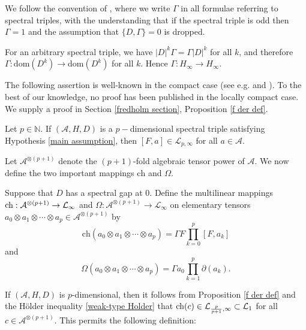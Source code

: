     We follow the convention of \cite{CGRS2}, where we write $\Gamma$ in all formulae referring to spectral triples, with the understanding that if the spectral triple is odd then $\Gamma=1$ and the assumption that $\{D,\Gamma\}=0$ is dropped.
    
    For an arbitrary spectral triple, we have $|D|^k\Gamma = \Gamma|D|^k$ for all $k$, and therefore $\Gamma:\mathrm{dom}(D^k)\to \mathrm{dom}(D^k)$ for all $k$. Hence $\Gamma:H_\infty\to H_\infty$.
    
    The following assertion is well-known in the compact case (see e.g. \cite{CPRS1} and \cite{PS-crelle}). To the best of our knowledge, no proof has been published in the locally compact case. 
    We supply a proof in Section \ref{fredholm section}, Proposition \ref{f der def}.
    \begin{prop*}
        {Let $p \in \mathbb{N}$.} If $(\mathcal{A},H,D)$ is a $p-$dimensional spectral triple satisfying Hypothesis \ref{main assumption}, then $[F,a]\in\mathcal{L}_{p,\infty}$ for all $a\in\mathcal{A}.$
    \end{prop*}
        
    Let $\mathcal{A}^{\otimes(p+1)}$ denote the $(p+1)$-fold algebraic tensor power of $\mathcal{A}$. We now define the two important mappings $\mathrm{ch}$ and $\Omega$.
    \begin{defi}\label{ch omega def} 
        Suppose that $D$ has a spectral gap at $0.$
        Define the multilinear mappings ${\rm ch}:\mathcal{A}^{\otimes (p+1)}\to\mathcal{L}_{\infty}$ and $\Omega:\mathcal{A}^{\otimes (p+1)}\to\mathcal{L}_{\infty}$ 
        on elementary tensors $a_0\otimes a_1\otimes\cdots\otimes a_p \in \mathcal{A}^{\otimes(p+1)}$ by
        \begin{equation*}
            \mathrm{ch}(a_0\otimes a_1\otimes\cdots \otimes a_p) = \Gamma F\prod_{k=0}^p[F,a_k]
        \end{equation*}
        and
        \begin{equation*}
            \Omega(a_0\otimes a_1\otimes \cdots \otimes a_p) = \Gamma a_0\prod_{k=1}^p \partial (a_k).
        \end{equation*}
    \end{defi}

    If $(\mathcal{A},H,D)$ is $p$-dimensional, then it follows from Proposition \ref{f der def} and the H\"older inequality \eqref{weak-type Holder} that ${\rm ch}(c)\in\mathcal{L}_{\frac{p}{p+1},\infty}\subset\mathcal{L}_1$
    for all $c\in\mathcal{A}^{\otimes (p+1)}.$ This permits the following definition:

